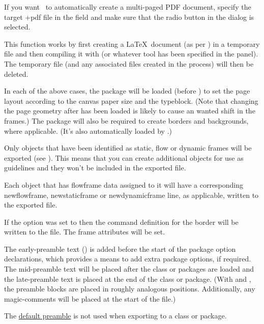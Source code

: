 If you want \FlowframTk\ to automatically create a multi-paged PDF 
document, specify the target \ext+{pdf} file in the
 field and make sure that the
 radio button in the  dialog
is selected.

This function works by first creating a \LaTeX\ document
(as per )
in a temporary file and then compiling it with
 (or whatever tool has been specified in the
 panel). The temporary file (and any
associated files created in the process) will then be deleted.

In each of the above cases, the  package will be
loaded (before ) to set the page layout according to
the \gls{canvas} paper size and the \gls{typeblock}. (Note that
changing the page geometry after  has been loaded is
likely to cause an wanted shift in the frames.)
The  package will also be
required to create borders and backgrounds, where applicable.
(It's also automatically loaded by .)

Only \glspl{object} that have been identified as static, flow or
dynamic frames will be exported (see ).
This means that you can create additional \glspl{object} for use as
guidelines and they won't be included in the exported file.

Each \gls{object} that has \gls{flowframe} data
assigned to it will have a corresponding \gls{newflowframe},
\gls{newstaticframe} or \gls{newdynamicframe} line, as applicable,
written to the exported file.

If the  option was set to 
then the command definition for the border will be written to the
file. The frame attributes will be set.

The \gls{early-preamble} text () is added before the
start of the package option declarations, which provides a means to
add extra package options, if required.  The \gls{mid-preamble} text will
be placed after the class or packages are loaded and the
\gls{late-preamble} text is placed at the end of the class or package.
(With  and , the
preamble blocks are placed in roughly analogous positions.
Additionally, any \glspl{magic-comment} will be placed at the start
of the  file.)

\begin{important}
The \hyperref[sec:texconfigpreamble]{default preamble} is not used
when exporting to a class or package.
\end{important}

